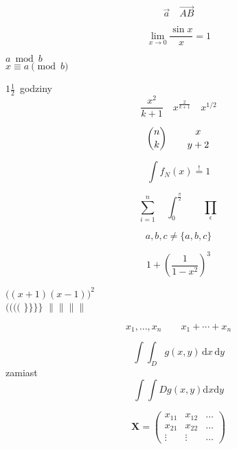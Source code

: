 \documentclass[10pt,a4paper]{article}
\begin{document}
\begin{displaymath}
\vec a\quad\overrightarrow{AB}
\end{displaymath}

\[\lim_{x \rightarrow 0}
\frac{\sin x}{x}=1\]

$a\bmod b$\\
$x\equiv a \pmod{b}$

$1\frac{1}{2}$~godziny
\begin{displaymath}
\frac{ x^{2} } { k+1 }\quad
x^{ \frac{2}{k+1} }\quad x^{ 1/2 }
\end{displaymath}

\begin{displaymath}
{n \choose k}\qquad {x \atop y+2}
\end{displaymath}

\begin{displaymath}
\int f_N(x) \stackrel{!}{=} 1
\end{displaymath}

\begin{displaymath}
\sum_{i=1}^n \quad
\int_{0}^{\frac{\pi}{2}}\qquad
\prod_\epsilon
\end{displaymath}

\begin{displaymath}
{a,b,c}\neq\{a,b,c\}
\end{displaymath}

\begin{displaymath}
1 + \left( \frac{1}{ 1-x^{2} }
\right)   ^3
\end{displaymath}

$\Big( (x+1) (x-1) \Big)^{2}$\\
$\big(\Big(\bigg(\Bigg($\quad
$\big\}\Big\}\bigg\}\Bigg\}$\quad
$\big\|\Big\|\bigg\|\Bigg\|$

\begin{displaymath}
x_{1},\ldots,x_{n} \qquad
x_{1}+\cdots+x_{n}
\end{displaymath}

\newcommand{\ud}{\mathrm{d}}
\begin{displaymath}
\int\!\!\!\int_{D} g(x,y)
\, \ud x\, \ud y
\end{displaymath}
%
zamiast 
\begin{displaymath}
\int\int{D} g(x,y)\ud x \ud y
\end{displaymath}

\begin{displaymath}
\mathbf{X} =
\left( \begin{array}{ccc}
x_{11} & x_{12} & \ldots \\
x_{21} & x_{22} & \ldots \\
\vdots & \vdots & \ldots
\end{array} \right)
\end{displaymath}
\end{document}

